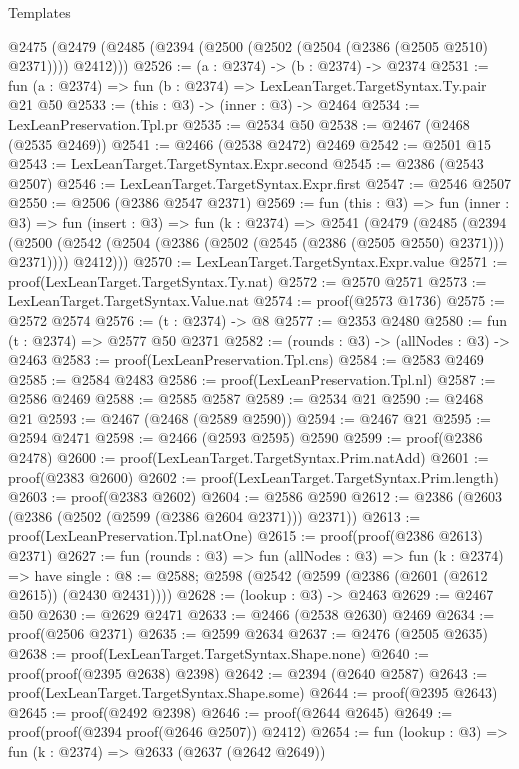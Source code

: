 \begin{lexlean}{Templates}
\begin{coremodule}
  @2475 (@2479 (@2485 (@2394 (@2500 (@2502 (@2504 (@2386 (@2505 @2510) @2371)))) @2412)))
@2526 := (a : @2374) -> (b : @2374) -> @2374
@2531 := fun (a : @2374) => fun (b : @2374) => LexLeanTarget.TargetSyntax.Ty.pair @21 @50
@2533 := (this : @3) -> (inner : @3) -> @2464
@2534 := LexLeanPreservation.Tpl.pr
@2535 := @2534 @50
@2538 := @2467 (@2468 (@2535 @2469))
@2541 := @2466 (@2538 @2472) @2469
@2542 := @2501 @15
@2543 := LexLeanTarget.TargetSyntax.Expr.second
@2545 := @2386 (@2543 @2507)
@2546 := LexLeanTarget.TargetSyntax.Expr.first
@2547 := @2546 @2507
@2550 := @2506 (@2386 @2547 @2371)
@2569 := fun (this : @3) =>
  fun (inner : @3) =>
  fun (insert : @3) =>
  fun (k : @2374) =>
  @2541
    (@2479
      (@2485
        (@2394
          (@2500 (@2542 (@2504 (@2386 (@2502 (@2545 (@2386 (@2505 @2550) @2371))) @2371))))
          @2412)))
@2570 := LexLeanTarget.TargetSyntax.Expr.value
@2571 := proof(LexLeanTarget.TargetSyntax.Ty.nat)
@2572 := @2570 @2571
@2573 := LexLeanTarget.TargetSyntax.Value.nat
@2574 := proof(@2573 @1736)
@2575 := @2572 @2574
@2576 := (t : @2374) -> @8
@2577 := @2353 @2480
@2580 := fun (t : @2374) => @2577 @50 @2371
@2582 := (rounds : @3) -> (allNodes : @3) -> @2463
@2583 := proof(LexLeanPreservation.Tpl.cns)
@2584 := @2583 @2469
@2585 := @2584 @2483
@2586 := proof(LexLeanPreservation.Tpl.nl)
@2587 := @2586 @2469
@2588 := @2585 @2587
@2589 := @2534 @21
@2590 := @2468 @21
@2593 := @2467 (@2468 (@2589 @2590))
@2594 := @2467 @21
@2595 := @2594 @2471
@2598 := @2466 (@2593 @2595) @2590
@2599 := proof(@2386 @2478)
@2600 := proof(LexLeanTarget.TargetSyntax.Prim.natAdd)
@2601 := proof(@2383 @2600)
@2602 := proof(LexLeanTarget.TargetSyntax.Prim.length)
@2603 := proof(@2383 @2602)
@2604 := @2586 @2590
@2612 := @2386 (@2603 (@2386 (@2502 (@2599 (@2386 @2604 @2371))) @2371))
@2613 := proof(LexLeanPreservation.Tpl.natOne)
@2615 := proof(proof(@2386 @2613) @2371)
@2627 := fun (rounds : @3) =>
  fun (allNodes : @3) =>
  fun (k : @2374) =>
  have single : @8 := @2588; @2598 (@2542 (@2599 (@2386 (@2601 (@2612 @2615)) (@2430 @2431))))
@2628 := (lookup : @3) -> @2463
@2629 := @2467 @50
@2630 := @2629 @2471
@2633 := @2466 (@2538 @2630) @2469
@2634 := proof(@2506 @2371)
@2635 := @2599 @2634
@2637 := @2476 (@2505 @2635)
@2638 := proof(LexLeanTarget.TargetSyntax.Shape.none)
@2640 := proof(proof(@2395 @2638) @2398)
@2642 := @2394 (@2640 @2587)
@2643 := proof(LexLeanTarget.TargetSyntax.Shape.some)
@2644 := proof(@2395 @2643)
@2645 := proof(@2492 @2398)
@2646 := proof(@2644 @2645)
@2649 := proof(proof(@2394 proof(@2646 @2507)) @2412)
@2654 := fun (lookup : @3) => fun (k : @2374) => @2633 (@2637 (@2642 @2649))

\end{coremodule}
\end{lexlean}
